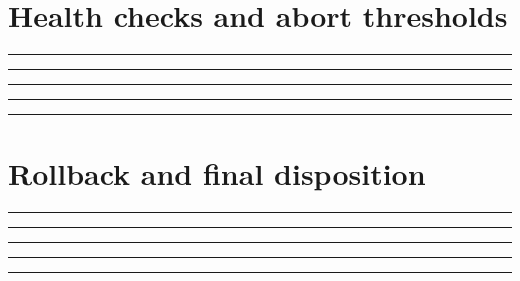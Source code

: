 \documentclass[11pt,letterpaper]{article}
\begin{document}
\section{Health checks and abort thresholds}
\vspace{2mm}
\noindent\rule{0.93\linewidth}{0.4pt}\par\vspace{13pt}
\noindent\rule{0.93\linewidth}{0.4pt}\par\vspace{13pt}
\noindent\rule{0.93\linewidth}{0.4pt}\par\vspace{13pt}
\noindent\rule{0.93\linewidth}{0.4pt}\par\vspace{13pt}
\noindent\rule{0.93\linewidth}{0.4pt}\par\vspace{13pt}
\section{Rollback and final disposition}
\vspace{2mm}
\noindent\rule{0.93\linewidth}{0.4pt}\par\vspace{13pt}
\noindent\rule{0.93\linewidth}{0.4pt}\par\vspace{13pt}
\noindent\rule{0.93\linewidth}{0.4pt}\par\vspace{13pt}
\noindent\rule{0.93\linewidth}{0.4pt}\par\vspace{13pt}
\noindent\rule{0.93\linewidth}{0.4pt}\par\vspace{13pt}
\end{document}
